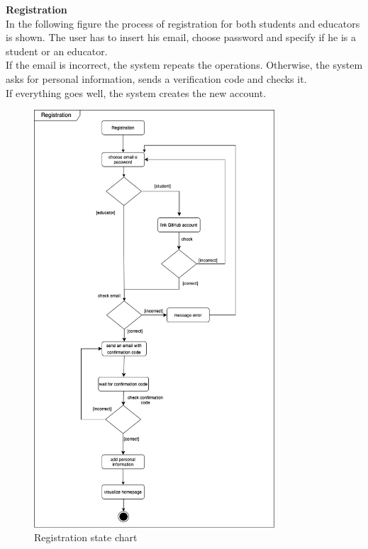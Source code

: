 \textbf{Registration}\\
In the following figure the process of registration for both students and educators is shown. 
The user has to insert his email, choose  password and specify if he is a student or an educator.\\
If the email is incorrect, the system repeats the operations. Otherwise, the system asks for personal information,
 sends a verification code and checks it.\\If everything goes well, the system creates the new account.
\begin{figure} [H]
  \centering
  \includegraphics[width=0.80\textwidth]{images/state_diagrams/Registration.jpg}
  \caption{Registration state chart}
\end{figure} \vspace{1cm}

